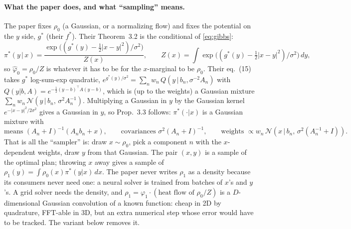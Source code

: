 \documentclass[11pt]{article}
\begin{document}
\paragraph{What the paper does, and what ``sampling'' means.}
The paper fixes $\rho_0$ (a Gaussian, or a normalizing flow) and fixes the
potential on the $y$ side, $g^\ast$ (their $f^\ast$). Their Theorem~3.2 is the
conditional of \eqref{eq:gibbs}:
\begin{equation}
  \pi^\ast(y\,|\,x)=\frac{\exp\bigl((g^\ast(y)-\tfrac12|x-y|^2)/\sigma^2\bigr)}{Z(x)},
  \qquad Z(x)=\int\exp\bigl((g^\ast(y)-\tfrac12|x-y|^2)/\sigma^2\bigr)\,dy,
  \label{eq:cond}
\end{equation}
so $\hat\varphi_0=\rho_0/Z$ is whatever it has to be for the $x$-marginal to be
$\rho_0$. Their eq.~(15) takes $g^\ast$ log-sum-exp quadratic,
$e^{g^\ast(y)/\sigma^2}=\sum_n w_n\,Q(y\,|\,b_n,\sigma^{-2}A_n)$ with
$Q(y|b,A)=e^{-\frac12(y-b)^\top A(y-b)}$, which is (up to the weights) a Gaussian
mixture $\sum_n w_n\,\mathcal N(y\,|\,b_n,\,\sigma^2A_n^{-1})$. Multiplying a
Gaussian in $y$ by the Gaussian kernel $e^{-|x-y|^2/2\sigma^2}$ gives a Gaussian in
$y$, so Prop.~3.3 follows: $\pi^\ast(\cdot|x)$ is a Gaussian mixture with
\[
  \text{means } (A_n+I)^{-1}(A_nb_n+x),\qquad
  \text{covariances } \sigma^2(A_n+I)^{-1},\qquad
  \text{weights } \propto w_n\,\mathcal N(x\,|\,b_n,\,\sigma^2(A_n^{-1}+I)).
\]
That is all the ``sampler'' is: draw $x\sim\rho_0$, pick a component $n$ with the
$x$-dependent weights, draw $y$ from that Gaussian. The pair $(x,y)$ is a sample of
the optimal plan; throwing $x$ away gives a sample of
$\rho_1(y)=\int\rho_0(x)\pi^\ast(y|x)\,dx$. The paper never writes $\rho_1$ as a
density because its consumers never need one: a neural solver is trained from
batches of $x$'s and $y$'s. A grid solver needs the density, and
$\rho_1=\varphi_1\cdot(\text{heat flow of }\rho_0/Z)$ is a $D$-dimensional
Gaussian convolution of a known function: cheap in 2D by quadrature, FFT-able in 3D,
but an extra numerical step whose error would have to be tracked. The variant below
removes it.
\end{document}
